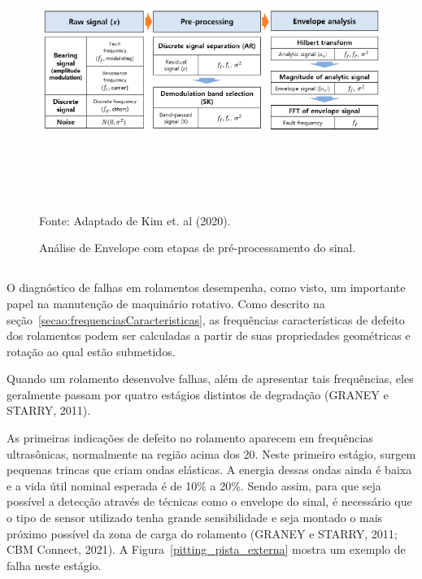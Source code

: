 \documentclass[
	12pt,				
	oneside,			
	a4paper,			
	english,			
	brazil,	
	sumario=abnt-6027-2012		
	]{abntex2ppgsi}
\begin{document}
\begin{figure}[H]
\centering
\caption {Análise de Envelope com etapas de pré-processamento do sinal.}
\includegraphics[width=\textwidth,height=90mm,keepaspectratio]{envelope_kim} \\
Fonte: Adaptado de Kim et. al (2020).
\label{envelope_kim}
\end{figure}

\subsection{}

O diagnóstico de falhas em rolamentos desempenha, como visto, um importante papel na manutenção de maquinário rotativo. Como descrito na seção~\ref{secao:frequenciasCaracteristicas}, as frequências características de defeito dos rolamentos podem ser calculadas a partir de suas propriedades geométricas e rotação ao qual estão submetidos. 

Quando um rolamento desenvolve falhas, além de apresentar tais frequências, eles geralmente passam por quatro estágios distintos de degradação (GRANEY e STARRY, 2011). 

As primeiras indicações de defeito no rolamento aparecem em frequências ultrasônicas, normalmente na região acima dos \SI{20}{\kilo{\hertz}}. Neste primeiro estágio, surgem pequenas trincas que criam ondas elásticas. A energia dessas ondas ainda é baixa e a vida útil nominal esperada é de 10\% a 20\%. Sendo assim, para que seja possível a detecção através de técnicas como o envelope do sinal, é necessário que o tipo de sensor utilizado tenha grande sensibilidade e seja montado o mais próximo possível da zona de carga do rolamento (GRANEY e STARRY, 2011; CBM Connect, 2021). A Figura~\ref{pitting_pista_externa} mostra um exemplo de falha neste estágio.
\end{document}
